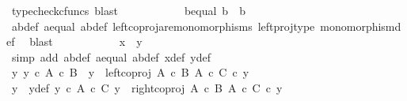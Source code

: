 \begin{isabellebody}
\ {\isacharparenleft}{\kern0pt}typecheck{\isacharunderscore}{\kern0pt}cfuncs{\isacharcomma}{\kern0pt}\ blast{\isacharparenright}{\kern0pt}\isanewline
\ \ \ \ \ \ \ \ \isamarkupfalse%
\ \isamarkupfalse%
\ b{\isacharunderscore}{\kern0pt}equal{\isacharcolon}{\kern0pt}\ {\isachardoublequoteopen}b\ {\isacharequal}{\kern0pt}\ b{\isacharprime}{\kern0pt}{\isachardoublequoteclose}\isanewline
\ \ \ \ \ \ \ \ \ \ \isamarkupfalse%
\ a{\isacharprime}{\kern0pt}b{\isacharprime}{\kern0pt}{\isacharunderscore}{\kern0pt}def\ a{\isacharunderscore}{\kern0pt}equal\ ab{\isacharunderscore}{\kern0pt}def\ left{\isacharunderscore}{\kern0pt}coproj{\isacharunderscore}{\kern0pt}are{\isacharunderscore}{\kern0pt}monomorphisms\ left{\isacharunderscore}{\kern0pt}proj{\isacharunderscore}{\kern0pt}type\ monomorphism{\isacharunderscore}{\kern0pt}def{}\ \isamarkupfalse%
\ blast\isanewline
\ \ \ \ \ \ \ \ \isamarkupfalse%
\ \isamarkupfalse%
\ {\isachardoublequoteopen}x\ {\isacharequal}{\kern0pt}\ y{\isachardoublequoteclose}\isanewline
\ \ \ \ \ \ \ \ \ \ \isamarkupfalse%
\ {\isacharparenleft}{\kern0pt}simp\ add{\isacharcolon}{\kern0pt}\ a{\isacharprime}{\kern0pt}b{\isacharprime}{\kern0pt}{\isacharunderscore}{\kern0pt}def\ a{\isacharunderscore}{\kern0pt}equal\ ab{\isacharunderscore}{\kern0pt}def\ x{\isacharprime}{\kern0pt}{\isacharunderscore}{\kern0pt}def\ y{\isacharprime}{\kern0pt}{\isacharunderscore}{\kern0pt}def{\isacharparenright}{\kern0pt}\isanewline
\ \ \ \ \isamarkupfalse%
\ \isanewline
\ \ \ \ \ \ \isamarkupfalse%
\ {\isachardoublequoteopen}{\isasymnexists}y{\isacharprime}{\kern0pt}{\isachardot}{\kern0pt}\ y{\isacharprime}{\kern0pt}\ {\isasymin}\isactrlsub c\ A\ {\isasymtimes}\isactrlsub c\ B\ {\isasymand}\ y\ {\isacharequal}{\kern0pt}\ left{\isacharunderscore}{\kern0pt}coproj\ {\isacharparenleft}{\kern0pt}A\ {\isasymtimes}\isactrlsub c\ B{\isacharparenright}{\kern0pt}\ {\isacharparenleft}{\kern0pt}A\ {\isasymtimes}\isactrlsub c\ C{\isacharparenright}{\kern0pt}\ {\isasymcirc}\isactrlsub c\ y{\isacharprime}{\kern0pt}{\isachardoublequoteclose}\isanewline
\ \ \ \ \ \ \isamarkupfalse%
\ \isamarkupfalse%
\ y{\isacharprime}{\kern0pt}\ \ y{\isacharprime}{\kern0pt}{\isacharunderscore}{\kern0pt}def{\isacharcolon}{\kern0pt}\ {\isachardoublequoteopen}y{\isacharprime}{\kern0pt}\ {\isasymin}\isactrlsub c\ A\ {\isasymtimes}\isactrlsub c\ C{\isachardoublequoteclose}\ {\isachardoublequoteopen}y\ {\isacharequal}{\kern0pt}\ right{\isacharunderscore}{\kern0pt}coproj\ {\isacharparenleft}{\kern0pt}A\ {\isasymtimes}\isactrlsub c\ B{\isacharparenright}{\kern0pt}\ {\isacharparenleft}{\kern0pt}A\ {\isasymtimes}\isactrlsub c\ C{\isacharparenright}{\kern0pt}\ {\isasymcirc}\isactrlsub c\ y{\isacharprime}{\kern0pt}{\isachardoublequoteclose}\isanewline

\end{isabellebody}
